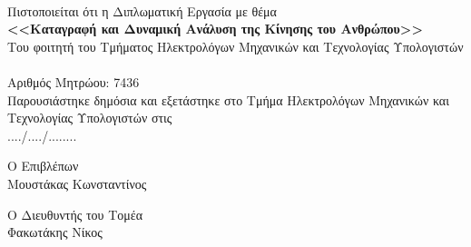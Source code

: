 \thispagestyle{empty}
\newpage

\thispagestyle{empty}
\clearpage\mbox{}\clearpage

\begin{center}
    {}\\[1cm]
    Πιστοποιείται ότι η Διπλωματική Εργασία με θέμα\\[0.5cm]
    \textbf{<<Καταγραφή και Δυναμική Ανάλυση της Κίνησης του Ανθρώπου>>}\\[1cm]
    Του φοιτητή του Τμήματος Ηλεκτρολόγων Μηχανικών και Τεχνολογίας Υπολογιστών\\[0.5cm]
    \\[10pt]
    Αριθμός Μητρώου: 7436\\[2cm]
    Παρουσιάστηκε δημόσια και εξετάστηκε στο Τμήμα Ηλεκτρολόγων Μηχανικών και Τεχνολογίας Υπολογιστών στις\\
    ..../..../........\\
\end{center}

\vfill

\begin{minipage}[t]{0.5\textwidth}
    \begin{flushleft}
        Ο Επιβλέπων\\
        Μουστάκας Κωνσταντίνος
    \end{flushleft}
\end{minipage}%
\begin{minipage}[t]{0.5\textwidth}
    \begin{flushright}
        Ο Διευθυντής του Τομέα\\
        Φακωτάκης Νίκος
    \end{flushright}
\end{minipage}%

\thispagestyle{empty}
\newpage
\clearpage\mbox{}
\thispagestyle{empty}
\clearpage
